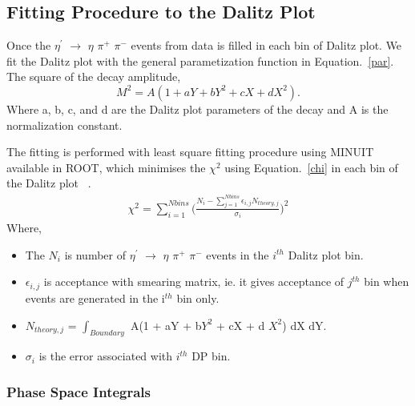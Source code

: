 \subsection{Fitting Procedure to the Dalitz Plot }

Once the $\eta^{\prime}$ $\rightarrow$ $\eta$ $\pi^{+}$ $\pi^{-}$ events from data is filled in each bin of Dalitz plot. We fit the Dalitz plot with the general parametization function in Equation.~\ref{par}. The square of the decay amplitude,
 \begin{equation}
M^{2}=A(1+aY+bY^{2}+cX+dX^{2}).
\label{par}
\end{equation}
Where a, b, c, and d are the Dalitz plot parameters of the decay and A is the normalization constant.

The fitting is performed with least square fitting procedure using MINUIT available in ROOT, which minimises the $\chi^{2}$ using Equation.~\ref{chi} in each bin of the Dalitz plot ~\cite{Caldeira}.
\begin{eqnarray}
\chi^{2} = \sum_{i=1}^{Nbins} \Bigg( \frac{N_{i} - \sum_{j=1}^{Nbins} \epsilon_{i,j} N_{theory,j}} {\sigma_{i}}   \Bigg)^{2}
\label{chi}
\end{eqnarray}
Where,
\begin {itemize}
\item The $N_{i}$ is number of $\eta^{\prime}$ $\rightarrow$ $\eta$ $\pi^{+}$ $\pi^{-}$ events in the $i^{th}$ Dalitz plot bin.
\item $\epsilon_{i,j}$ is acceptance with smearing matrix, ie.  it gives acceptance of $j^{th}$ bin when events are generated in the i$^{th}$ bin only.
\item $N_{theory,j}$ = $\int_{Boundary}$ A(1 + aY + b$Y^{2}$ + cX + d $X^{2}$) dX dY. 
\item $\sigma_{i}$ is the error associated with $i^{th}$ DP bin.
\end {itemize}

\subsubsection{Phase Space Integrals}

